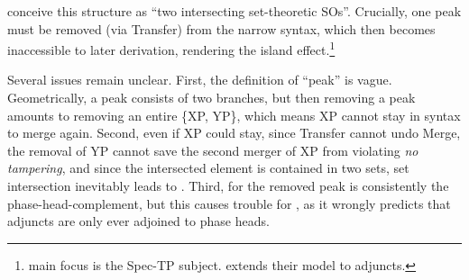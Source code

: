 \documentclass[output=paper]{langsci/langscibook}
\begin{document}
\ea\label{ex:peak}
\z

\noindent \citet[261]{EpsteinEtal2012} conceive this structure as ``two
intersecting set-theoretic \glspl{SO}''. Crucially, one peak must
be removed (via Transfer) from the narrow syntax, which then becomes
inaccessible to later derivation, rendering the island
effect.\footnote{ main focus is the Spec-TP
subject. \citeauthor{Oseki2015} extends their model to adjuncts.}

Several issues remain unclear. First, the definition of ``peak'' is vague.
Geometrically, a peak consists of two branches, but then removing a peak
amounts to removing an entire \{XP, YP\}, which means XP cannot stay in syntax
to merge again. Second, even if XP could stay, since Transfer cannot undo
Merge, the removal of YP cannot save the second merger of XP from violating \textit{no
tampering}, and since the intersected element is contained in two sets, set
intersection inevitably leads to . Third, for
\citeauthor{EpsteinEtal2012} the removed peak is consistently the
phase-head-complement, but this causes trouble for \citeauthor{Oseki2015}, as
it wrongly predicts that adjuncts are only ever adjoined to phase
heads.

\end{document}
